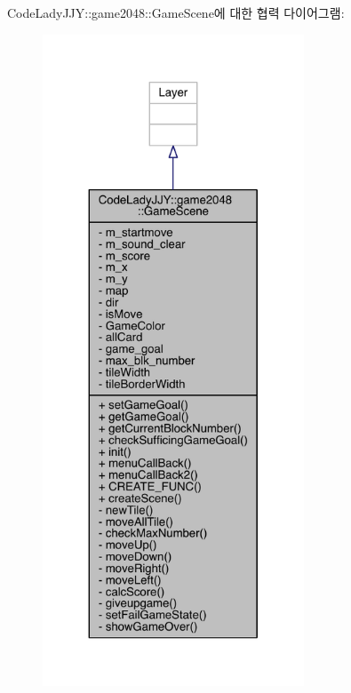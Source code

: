 Code\+Lady\+J\+JY\+:\+:game2048\+:\+:Game\+Scene에 대한 협력 다이어그램\+:
\nopagebreak
\begin{figure}[H]
\begin{center}
\leavevmode
\includegraphics[height=550pt]{d6/dc7/class_code_lady_j_j_y_1_1game2048_1_1_game_scene__coll__graph}
\end{center}
\end{figure}
